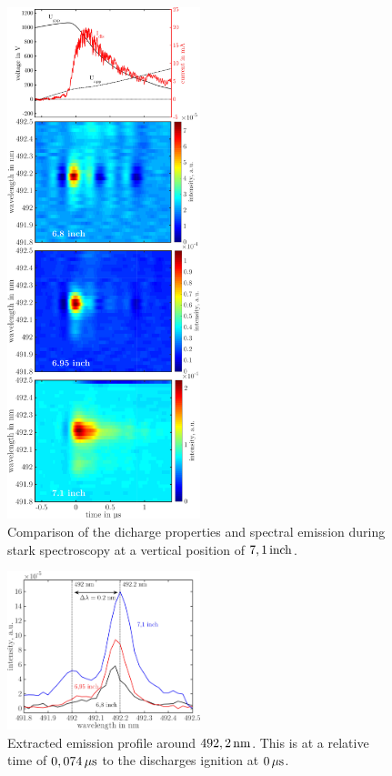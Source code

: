 \documentclass[a4paper,10pt,twoside]{article}
\begin{document}
				\begin{figure}
					\centering
					\includegraphics[width=0.5\textwidth]{figures/stark/combinations/starkallheightscombination.pdf}
					\caption{Comparison of the dicharge properties and spectral emission during stark spectroscopy at a vertical position of $\unit[7,1]{inch}$. }
					\label{img:stark71comparison}
				\end{figure}

				\begin{figure}
					\centering
					\includegraphics[width=0.5\textwidth]{figures/stark/combinations/stark_shiftallheights.pdf}
					\caption{Extracted emission profile around $\unit[492,2]{nm}$. This is at a relative time of $\unit[0,074]{\mu s}$ to the discharges ignition at $\unit[0]{\mu s}$.}
					\label{img:starkshift71}
				\end{figure}
\end{document}
